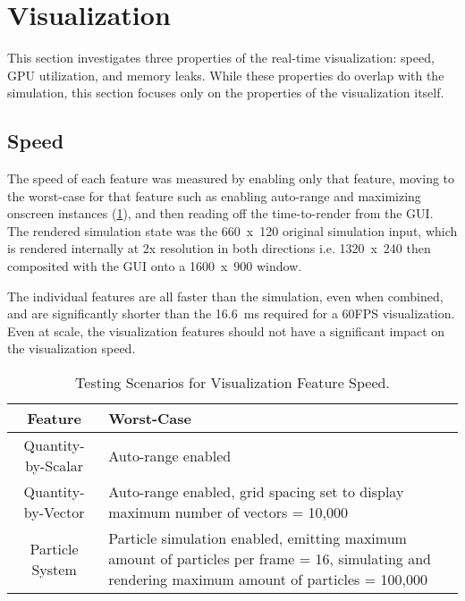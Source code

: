 \pagebreak
\section{Visualization}\label{sec:Results:Viz}
This section investigates three properties of the real-time visualization: speed, GPU utilization, and memory leaks.
While these properties do overlap with the simulation, this section focuses only on the properties of the visualization itself.

\subsection{Speed}\label{sec:Results:Viz:Speed}
The speed of each feature was measured by enabling only that feature, moving to the worst-case for that feature such as enabling auto-range and maximizing onscreen instances (\cref{tab:results:vizworstcases}), and then reading off the time-to-render from the GUI.
The rendered simulation state was the 660~x~120 original simulation input, which is rendered internally at 2x resolution in both directions i.e. 1320~x~240 then composited with the GUI onto a 1600~x~900 window.

The individual features are all faster than the simulation, even when combined, and are significantly shorter than the \SI{16.6}{\milli\second} required for a 60FPS visualization.
Even at scale, the visualization features should not have a significant impact on the visualization speed.

\begin{table}
    \centering
    \begin{tabular}{c|p{}}
        Feature & Worst-Case \\
        \hline
        Quantity-by-Scalar & Auto-range enabled \\
        Quantity-by-Vector & Auto-range enabled, grid spacing set to display maximum number of vectors = 10,000 \\
        Particle System & Particle simulation enabled, emitting maximum amount of particles per frame = 16, simulating and rendering maximum amount of particles = 100,000 \\
    \end{tabular}
    \caption{Testing Scenarios for Visualization Feature Speed.}
    \label{tab:results:vizworstcases}
\end{table}

